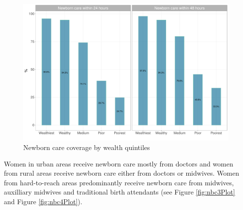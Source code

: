 \documentclass[12pt,a4paper]{article}
\begin{document}
\begin{figure}[H]

{\centering \includegraphics{kayahReport_files/figure-latex/nbc2Plot-1} 

}

\caption{Newborn care coverage by wealth quintiles}\label{fig:nbc2Plot}
\end{figure}

Women in urban areas receive newborn care mostly from doctors and women from rural areas receive newborn care either from doctors or midwives. Women from hard-to-reach areas predominantly receive newborn care from midwives, auxilliary midwives and traditional birth attendants (see Figure \ref{fig:nbc3Plot} and Figure \ref{fig:nbc4Plot}).
\end{document}
